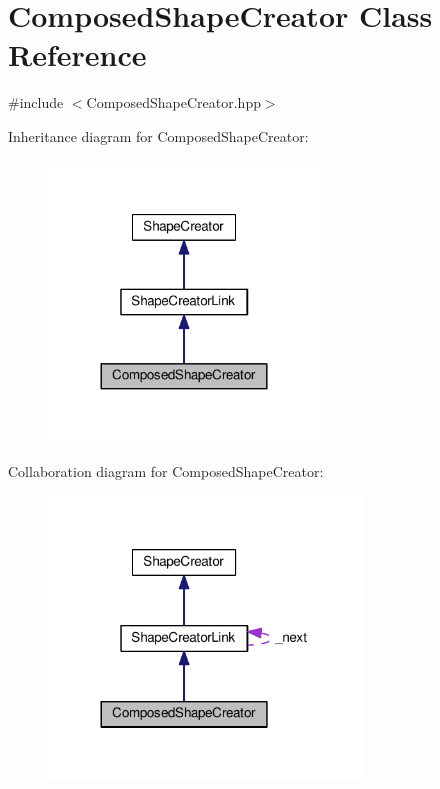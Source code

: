 \hypertarget{class_composed_shape_creator}{}\section{Composed\+Shape\+Creator Class Reference}
\label{class_composed_shape_creator}


{\ttfamily \#include $<$Composed\+Shape\+Creator.\+hpp$>$}



Inheritance diagram for Composed\+Shape\+Creator\+:\nopagebreak
\begin{figure}[H]
\begin{center}
\leavevmode
\includegraphics[width=204pt]{class_composed_shape_creator__inherit__graph}
\end{center}
\end{figure}


Collaboration diagram for Composed\+Shape\+Creator\+:\nopagebreak
\begin{figure}[H]
\begin{center}
\leavevmode
\includegraphics[width=236pt]{class_composed_shape_creator__coll__graph}
\end{center}
\end{figure}
